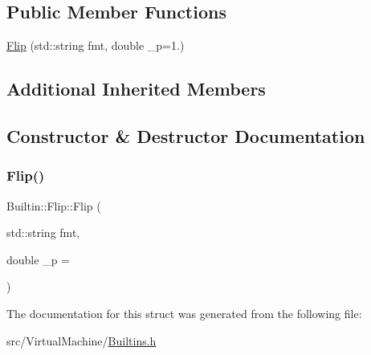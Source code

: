 \subsection*{Public Member Functions}
\begin{DoxyCompactItemize}
\item 
\hyperlink{struct_builtin_1_1_flip_a7b2664f6342725c1f1fb91d770b34843}{Flip} (std\+::string fmt, double \+\_\+p=1.)
\end{DoxyCompactItemize}
\subsection*{Additional Inherited Members}


\subsection{Constructor \& Destructor Documentation}
\mbox{\label{struct_builtin_1_1_flip_a7b2664f6342725c1f1fb91d770b34843}} 
\subsubsection{\texorpdfstring{Flip()}{Flip()}}
{\footnotesize\ttfamily Builtin\+::\+Flip\+::\+Flip (\begin{DoxyParamCaption}\item[{std\+::string}]{fmt,  }\item[{double}]{\+\_\+p = {} }\end{DoxyParamCaption})\hspace{0.3cm}{\ttfamily [inline]}}



The documentation for this struct was generated from the following file\+:\begin{DoxyCompactItemize}
\item 
src/\+Virtual\+Machine/\hyperlink{_builtins_8h}{Builtins.\+h}\end{DoxyCompactItemize}
